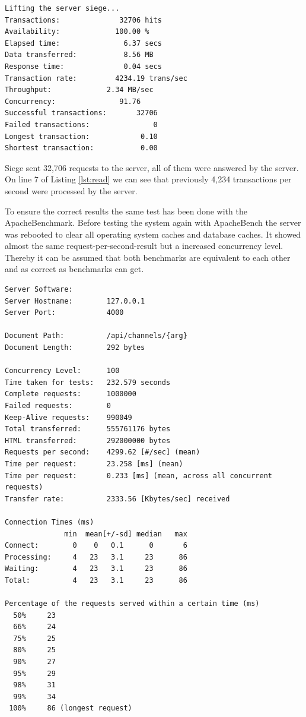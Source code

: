 \begin{lstlisting}[caption={read benchmark by siege},label=lst:read]
Lifting the server siege...
Transactions:		       32706 hits
Availability:		      100.00 %
Elapsed time:		        6.37 secs
Data transferred:	        8.56 MB
Response time:		        0.04 secs
Transaction rate:	      4234.19 trans/sec
Throughput:		        2.34 MB/sec
Concurrency:		       91.76
Successful transactions:       32706
Failed transactions:	           0
Longest transaction:	        0.10
Shortest transaction:	        0.00
\end{lstlisting}
\textcolor{newcode}{Siege sent 32,706 requests to the server, all of them were answered by the server. On line 7 of Listing \ref{lst:read} we can see that previously 4,234 transactions per second were processed by the server.}

To ensure the correct results the same test has been done with the ApacheBenchmark. Before testing the system again with ApacheBench the server was rebooted to clear all operating system caches and database caches. It showed almost the same request-per-second-result but a increased concurrency level. Thereby  it can be assumed that both benchmarks are equivalent to each other and as correct as benchmarks can get. 
\newpage
\begin{lstlisting}
Server Software:        
Server Hostname:        127.0.0.1
Server Port:            4000

Document Path:          /api/channels/{arg}
Document Length:        292 bytes

Concurrency Level:      100
Time taken for tests:   232.579 seconds
Complete requests:      1000000
Failed requests:        0
Keep-Alive requests:    990049
Total transferred:      555761176 bytes
HTML transferred:       292000000 bytes
Requests per second:    4299.62 [#/sec] (mean)
Time per request:       23.258 [ms] (mean)
Time per request:       0.233 [ms] (mean, across all concurrent requests)
Transfer rate:          2333.56 [Kbytes/sec] received

Connection Times (ms)
              min  mean[+/-sd] median   max
Connect:        0    0   0.1      0       6
Processing:     4   23   3.1     23      86
Waiting:        4   23   3.1     23      86
Total:          4   23   3.1     23      86

Percentage of the requests served within a certain time (ms)
  50%     23
  66%     24
  75%     25
  80%     25
  90%     27
  95%     29
  98%     31
  99%     34
 100%     86 (longest request)
\end{lstlisting}


